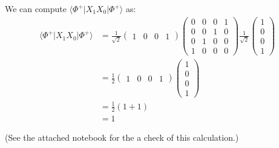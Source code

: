 \documentclass[12pt]{extarticle}
\begin{document}
\begin{enumerate}[(i)]
We can compute $\langle \Phi^{+}|X_1X_0|\Phi^{+}\rangle$ as:
\begin{align*}
\langle \Phi^{+}|X_1X_0|\Phi^{+}\rangle
& = \frac{1}{\sqrt{2}}\begin{pmatrix}1&0&0&1\end{pmatrix}
\begin{pmatrix}0&0&0&1\\0&0&1&0\\0&1&0&0\\1&0&0&0\end{pmatrix}
\frac{1}{\sqrt{2}} \begin{pmatrix}1\\0\\0\\1\end{pmatrix} \\
& = \frac{1}{2}\begin{pmatrix}1&0&0&1\end{pmatrix} \begin{pmatrix}1\\0\\0\\1\end{pmatrix} \\
& = \frac{1}{2}(1+1) \\
& = 1
\end{align*}

(See the attached {\mathematica}
notebook for the a check of this calculation.)

\end{enumerate}
\end{document}
